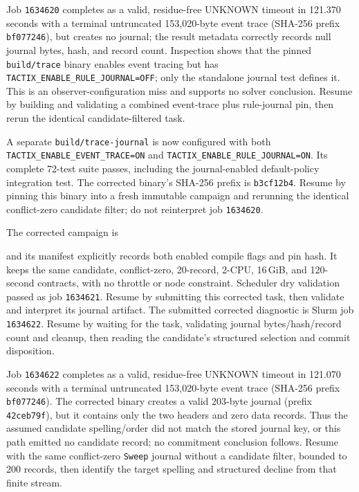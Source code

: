 \documentclass[11pt]{article}
\newcommand{\code}[1]{\texttt{#1}}
\newcommand{\artifact}[1]{\path{#1}}
\begin{document}
Job \code{1634620} completes as a valid, residue-free UNKNOWN timeout in
121.370 seconds with a terminal untruncated 153,020-byte event trace (SHA-256
prefix \code{bf077246}), but creates no journal; the result metadata correctly
records null journal bytes, hash, and record count. Inspection shows that the
pinned \code{build/trace} binary enables event tracing but has
\code{TACTIX\_ENABLE\_RULE\_JOURNAL=OFF}; only the standalone journal test
defines it. This is an observer-configuration miss and supports no solver
conclusion. Resume by building and validating a combined event-trace plus
rule-journal pin, then rerun the identical candidate-filtered task.

A separate \code{build/trace-journal} is now configured with both
\code{TACTIX\_ENABLE\_EVENT\_TRACE=ON} and
\code{TACTIX\_ENABLE\_RULE\_JOURNAL=ON}. Its complete 72-test suite passes,
including the journal-enabled default-policy integration test. The corrected
binary's SHA-256 prefix is \code{b3cf12b4}. Resume by pinning this binary into
a fresh immutable campaign and rerunning the identical conflict-zero candidate
filter; do not reinterpret job \code{1634620}.

The corrected campaign is
\begin{center}\small\artifact{20260819-1207-tierd-rank22-sweep-commit-journal}\end{center}
and its manifest explicitly records both enabled compile flags and pin hash.
It keeps the same candidate, conflict-zero, 20-record, 2-CPU, 16\,GiB, and
120-second contracts, with no throttle or node constraint. Scheduler dry
validation passed as job \code{1634621}. Resume by submitting this corrected
task, then validate and interpret its journal artifact.
The submitted corrected diagnostic is Slurm job \code{1634622}. Resume by
waiting for the task, validating journal bytes/hash/record count and cleanup,
then reading the candidate's structured selection and commit disposition.

Job \code{1634622} completes as a valid, residue-free UNKNOWN timeout in
121.070 seconds with a terminal untruncated 153,020-byte event trace (SHA-256
prefix \code{bf077246}). The corrected binary creates a valid 203-byte journal
(prefix \code{42ceb79f}), but it contains only the two headers and zero data
records. Thus the assumed candidate spelling/order did not match the stored
journal key, or this path emitted no candidate record; no commitment conclusion
follows. Resume with the same conflict-zero \code{Sweep} journal without a
candidate filter, bounded to 200 records, then identify the target spelling and
structured decline from that finite stream.
\end{document}
